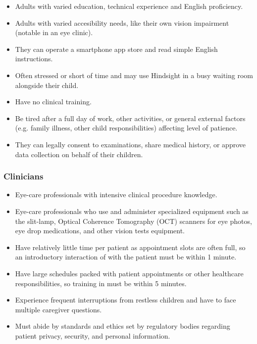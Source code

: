 \documentclass[12pt]{article}
\begin{document}
\begin{itemize}
    \item Adults with varied education, technical experience and English proficiency. 
    \item Adults with varied accesibility needs, like their own vision impairment (notable in an eye clinic).
    \item They can operate a smartphone app store and read simple English instructions.
    \item Often stressed or short of time and may use Hindsight in a busy waiting room alongside 
    their child.
    \item Have no clinical training.
    \item Be tired after a full day of work, other activities, or general external factors (e.g. family 
    illness, other child responsibilities) affecting level of patience.
    \item They can legally consent to examinations, share medical history, or approve data collection 
    on behalf of their children.
\end{itemize}

\subsubsection*{\textbf{Clinicians}}
\begin{itemize}
    \item Eye-care professionals with intensive clinical procedure knowledge.
    \item Eye-care professionals who use and administer specialized equipment such as the slit-lamp, 
    Optical Coherence Tomography (OCT) scanners for eye photos, eye drop medications, and other 
    vision tests equipment.
    \item Have relatively little time per patient as appointment slots are often full, so an 
    introductory interaction of \progname{} with the patient must be within 1 minute.
    \item Have large schedules packed with patient appointments or other healthcare responsibilities, 
    so training in \progname{} must be within 5 minutes.
    \item Experience frequent interruptions from restless children and have to face 
    multiple caregiver questions.
    \item Must abide by standards and ethics set by regulatory bodies regarding patient privacy, 
    security, and personal information.
\end{itemize}
\end{document}
